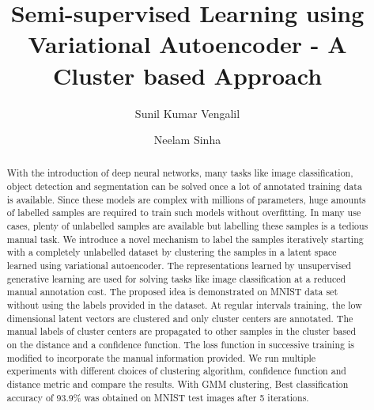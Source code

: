 \documentclass[runningheads]{llncs}
\begin{document}
%
\title{Semi-supervised Learning using Variational Autoencoder - A Cluster based Approach}
%
%
\author{Sunil Kumar Vengalil \and
Neelam Sinha }
%
%
%
\maketitle              %
%
\begin{abstract}
    With the introduction of deep neural networks, many tasks like image classification, object detection and segmentation can be solved once a lot of annotated training data is available.
Since these models are complex with millions of parameters, huge amounts of labelled samples are required to train such models without overfitting.
In many use cases, plenty of unlabelled samples are available but labelling these samples is a tedious manual task.
We introduce a novel mechanism to label the samples iteratively starting with a completely unlabelled dataset by clustering the samples in a latent space learned using variational autoencoder.
    The representations learned by unsupervised generative learning  are used for solving tasks like image classification at a reduced manual annotation cost.
The proposed  idea  is demonstrated on MNIST data set without using the labels provided in the dataset.
At regular intervals  training, the low dimensional latent vectors are clustered and only cluster centers are annotated.
    The manual labels of cluster centers are propagated to other samples in the cluster based on the distance and a confidence function.
The loss function in successive training is modified to incorporate the manual information provided.
    We run multiple experiments with different choices of clustering algorithm, confidence function and distance metric and compare the results.
With GMM clustering, Best classification accuracy of 93.9\% was obtained on MNIST test images after 5 iterations.

\end{abstract}
%
%
%
\end{document}
